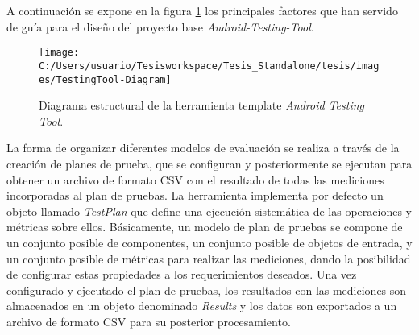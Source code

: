 A continuación se expone en la figura \ref{fig:TestingTool-Diagram}
los principales factores que han servido de guía para el diseño del
proyecto base \emph{Android-Testing-Tool}. 

\begin{figure}
\begin{centering}
\texttt{[image: C:/Users/usuario/Tesisworkspace/Tesis\_Standalone/tesis/images/TestingTool-Diagram]}
\par\end{centering}

\caption{Diagrama estructural de la herramienta template \emph{Android Testing
Tool}.\label{fig:TestingTool-Diagram}}


%
%
\end{figure}


La forma de organizar diferentes modelos de evaluación se realiza
a través de la creación de planes de prueba, que se configuran y posteriormente
se ejecutan para obtener un archivo de formato \ac{CSV} con el resultado
de todas las mediciones incorporadas al plan de pruebas. La herramienta
implementa por defecto un objeto llamado \emph{TestPlan} que define
una ejecución sistemática de las operaciones y métricas sobre ellos.
Básicamente, un modelo de plan de pruebas se compone de un conjunto
posible de componentes, un conjunto posible de objetos de entrada,
y un conjunto posible de métricas para realizar las mediciones, dando
la posibilidad de configurar estas propiedades a los requerimientos
deseados. Una vez configurado y ejecutado el plan de pruebas, los
resultados con las mediciones son almacenados en un objeto denominado
\emph{Results} y los datos son exportados a un archivo de formato
\ac{CSV} para su posterior procesamiento. 

